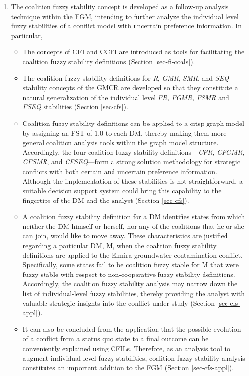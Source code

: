 \begin{enumerate}
\item The coalition fuzzy stability concept is developed as a follow-up analysis technique within the FGM, intending to further analyze the individual level fuzzy stabilities of a conflict model with uncertain preference information. In particular,
  \begin{itemize}
    \item The concepts of CFI and CCFI are introduced as tools for facilitating the coalition fuzzy stability definitions (Section \ref{sec-fi-coals}).
    \item The coalition fuzzy stability definitions for \emph{R}, \emph{GMR}, \emph{SMR}, and \emph{SEQ} stability concepts of the GMCR are developed so that they constitute a natural generalization of the individual level \emph{FR}, \emph{FGMR}, \emph{FSMR} and \emph{FSEQ} stabilities (Section \ref{sec-cfs}).
    \item Coalition fuzzy stability definitions can be applied to a crisp graph model by assigning an FST of $1.0$ to each DM, thereby making them more general coalition analysis tools within the graph model structure. Accordingly, the four coalition fuzzy stability definitions---\emph{CFR}, \emph{CFGMR}, \emph{CFSMR}, and \emph{CFSEQ}---form a strong solution methodology for strategic conflicts with both certain and uncertain preference information. Although the implementation of these stabilities is not straightforward, a suitable decision support system could bring this capability to the fingertips of the DM and the analyst (Section \ref{sec-cfs}).
    \item A coalition fuzzy stability definition for a DM identifies states from which neither the DM himself or herself, nor any of the coalitions that he or she can join, would like to move away. These characteristics are justified regarding a particular DM, M, when the coalition fuzzy stability definitions are applied to the Elmira groundwater contamination conflict. Specifically, some states fail to be coalition fuzzy stable for M that were fuzzy stable with respect to non-cooperative fuzzy stability definitions. Accordingly, the coalition fuzzy stability analysis may narrow down the list of individual-level fuzzy stabilities, thereby providing the analyst with valuable strategic insights into the conflict under study (Section \ref{sec-cfs-appl}).
    \item It can also be concluded from the application that the possible evolution of a conflict from a status quo state to a final outcome can be conveniently explained using CFILs. Therefore, as an analysis tool to augment individual-level fuzzy stabilities, coalition fuzzy stability analysis constitutes an important addition to the FGM (Section \ref{sec-cfs-appl}).
  \end{itemize}


\end{enumerate}
